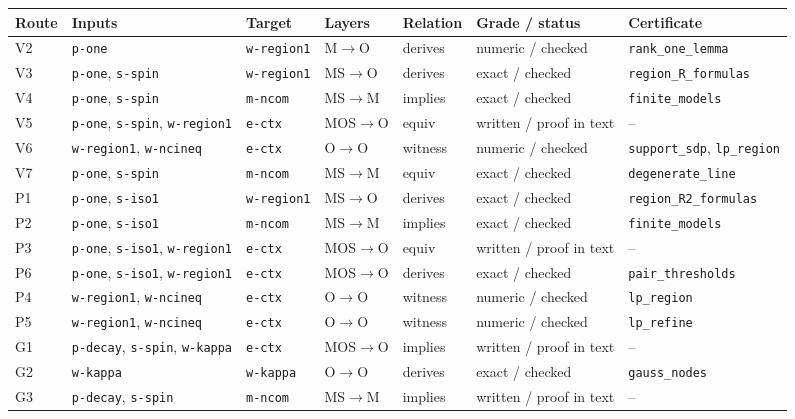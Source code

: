 \begin{ruledtabular}
\begin{tabular}{lllllll}
Route & Inputs & Target & Layers & Relation & Grade / status & Certificate \\
\hline
V2 & \texttt{p-one} & \texttt{w-region1} & M$\to$O & derives & numeric / checked & \texttt{rank\_one\_lemma} \\
V3 & \texttt{p-one}, \texttt{s-spin} & \texttt{w-region1} & MS$\to$O & derives & exact / checked & \texttt{region\_R\_formulas} \\
V4 & \texttt{p-one}, \texttt{s-spin} & \texttt{m-ncom} & MS$\to$M & implies & exact / checked & \texttt{finite\_models} \\
V5 & \texttt{p-one}, \texttt{s-spin}, \texttt{w-region1} & \texttt{e-ctx} & MOS$\to$O & equiv & written / proof in text & -- \\
V6 & \texttt{w-region1}, \texttt{w-ncineq} & \texttt{e-ctx} & O$\to$O & witness & numeric / checked & \texttt{support\_sdp}, \texttt{lp\_region} \\
V7 & \texttt{p-one}, \texttt{s-spin} & \texttt{m-ncom} & MS$\to$M & equiv & exact / checked & \texttt{degenerate\_line} \\
P1 & \texttt{p-one}, \texttt{s-iso1} & \texttt{w-region1} & MS$\to$O & derives & exact / checked & \texttt{region\_R2\_formulas} \\
P2 & \texttt{p-one}, \texttt{s-iso1} & \texttt{m-ncom} & MS$\to$M & implies & exact / checked & \texttt{finite\_models} \\
P3 & \texttt{p-one}, \texttt{s-iso1}, \texttt{w-region1} & \texttt{e-ctx} & MOS$\to$O & equiv & written / proof in text & -- \\
P6 & \texttt{p-one}, \texttt{s-iso1}, \texttt{w-region1} & \texttt{e-ctx} & MOS$\to$O & derives & exact / checked & \texttt{pair\_thresholds} \\
P4 & \texttt{w-region1}, \texttt{w-ncineq} & \texttt{e-ctx} & O$\to$O & witness & numeric / checked & \texttt{lp\_region} \\
P5 & \texttt{w-region1}, \texttt{w-ncineq} & \texttt{e-ctx} & O$\to$O & witness & numeric / checked & \texttt{lp\_refine} \\
G1 & \texttt{p-decay}, \texttt{s-spin}, \texttt{w-kappa} & \texttt{e-ctx} & MOS$\to$O & implies & written / proof in text & -- \\
G2 & \texttt{w-kappa} & \texttt{w-kappa} & O$\to$O & derives & exact / checked & \texttt{gauss\_nodes} \\
G3 & \texttt{p-decay}, \texttt{s-spin} & \texttt{m-ncom} & MS$\to$M & implies & written / proof in text & -- \\

\end{tabular}
\end{ruledtabular}
